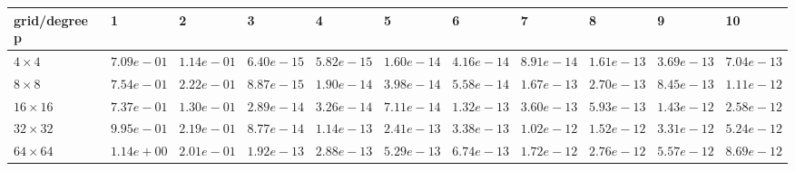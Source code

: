 \begin{tabular}{lllllllllll}
\hline
 grid/degree p   & 1          & 2          & 3          & 4          & 5          & 6          & 7          & 8          & 9          & 10         \\
\hline
 $4 \times 4$    & $7.09e-01$ & $1.14e-01$ & $6.40e-15$ & $5.82e-15$ & $1.60e-14$ & $4.16e-14$ & $8.91e-14$ & $1.61e-13$ & $3.69e-13$ & $7.04e-13$ \\
 $8 \times 8$    & $7.54e-01$ & $2.22e-01$ & $8.87e-15$ & $1.90e-14$ & $3.98e-14$ & $5.58e-14$ & $1.67e-13$ & $2.70e-13$ & $8.45e-13$ & $1.11e-12$ \\
 $16 \times 16$  & $7.37e-01$ & $1.30e-01$ & $2.89e-14$ & $3.26e-14$ & $7.11e-14$ & $1.32e-13$ & $3.60e-13$ & $5.93e-13$ & $1.43e-12$ & $2.58e-12$ \\
 $32 \times 32$  & $9.95e-01$ & $2.19e-01$ & $8.77e-14$ & $1.14e-13$ & $2.41e-13$ & $3.38e-13$ & $1.02e-12$ & $1.52e-12$ & $3.31e-12$ & $5.24e-12$ \\
 $64 \times 64$  & $1.14e+00$ & $2.01e-01$ & $1.92e-13$ & $2.88e-13$ & $5.29e-13$ & $6.74e-13$ & $1.72e-12$ & $2.76e-12$ & $5.57e-12$ & $8.69e-12$ \\
\hline
\end{tabular}